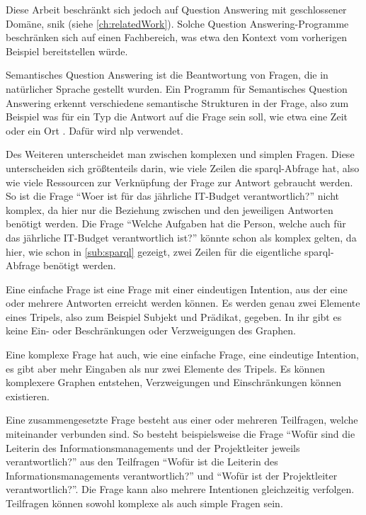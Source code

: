 Diese Arbeit beschränkt sich jedoch auf Question Answering mit geschlossener Domäne, \ac{snik} (siehe \cref{ch:relatedWork}).
Solche Question Answering-Programme beschränken sich auf einen Fachbereich,
was etwa den Kontext vom vorherigen Beispiel bereitstellen würde.

\begin{definition}
Semantisches Question Answering ist die Beantwortung von Fragen, die in natürlicher Sprache gestellt wurden.
Ein Programm für Semantisches Question Answering erkennt verschiedene semantische Strukturen in der Frage,
also zum Beispiel was für ein Typ die Antwort auf die Frage sein soll, wie etwa eine Zeit oder ein Ort \citep{sqadefinition}.
Dafür wird \acs{nlp} verwendet.
\end{definition}

Des Weiteren unterscheidet man zwischen komplexen und simplen Fragen.
Diese unterscheiden sich größtenteils darin, wie viele Zeilen die \ac{sparql}-Abfrage hat, also wie viele Ressourcen zur Verknüpfung der Frage zur Antwort gebraucht werden.
So ist die Frage \enquote{Woer ist für das jährliche IT-Budget verantwortlich?} nicht komplex,
da hier nur die Beziehung zwischen  und den jeweiligen Antworten benötigt werden.
Die Frage \enquote{Welche Aufgaben hat die Person, welche auch für das jährliche IT-Budget verantwortlich ist?} könnte schon als komplex gelten, da hier, wie schon in \cref{sub:sparql} gezeigt,
zwei Zeilen für die eigentliche \ac{sparql}-Abfrage benötigt werden.

\begin{definition}
Eine einfache Frage ist eine Frage mit einer eindeutigen Intention, aus der eine oder mehrere Antworten erreicht werden können.
Es werden genau zwei Elemente eines Tripels, also zum Beispiel Subjekt und Prädikat, gegeben.
In ihr gibt es keine Ein- oder Beschränkungen oder Verzweigungen des Graphen.
\end{definition}

\begin{definition}
Eine komplexe Frage hat auch, wie eine einfache Frage, eine eindeutige Intention, es gibt aber mehr Eingaben als nur zwei Elemente des Tripels.
Es können komplexere Graphen entstehen, Verzweigungen und Einschränkungen können existieren.
\end{definition}

\begin{definition}
Eine zusammengesetzte Frage besteht aus einer oder mehreren Teilfragen, welche miteinander verbunden sind.
So besteht beispielsweise die Frage \enquote{Wofür sind die Leiterin des Informationsmanagements und der Projektleiter jeweils verantwortlich?} aus den Teilfragen
\enquote{Wofür ist die Leiterin des Informationsmanagements verantwortlich?} und \enquote{Wofür ist der Projektleiter verantwortlich?}.
Die Frage kann also mehrere Intentionen gleichzeitig verfolgen.
Teilfragen können sowohl komplexe als auch simple Fragen sein.
\end{definition}

